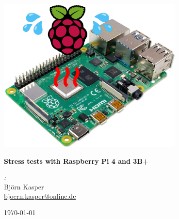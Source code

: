 \documentclass[10pt,parskip=half,
toc=sectionentrywithdots,
bibliography=totocnumbered,
captions=tableheading,numbers=noendperiod]{scrartcl}
\begin{document}
    \begin{titlepage}
  \begin{flushright}
    \includegraphics[width=0.7\textwidth]{Raspberry_Pi4_stress_test_files/Cover_image.pdf}
  \end{flushright}

  \begin{center}

  \vspace*{1cm}

  \Huge\textbf{Stress tests with Raspberry Pi 4 and 3B+}

  \vspace{0.5cm}

  \vspace{1.5cm}

  \begin{minipage}{0.8\textwidth}
    \begin{center}
    \begin{minipage}{0.39\textwidth}
    \begin{flushleft} \Large
    \emph{:}\\Björn Kasper\\\href{mailto:bjoern.kasper@online.de}{bjoern.kasper@online.de}
    \end{flushleft}
    \end{minipage}
    \hspace{\fill}
    \begin{minipage}{0.39\textwidth}
    \begin{flushright} \Large
    \end{flushright}
    \end{minipage}
    \end{center}
  \end{minipage}

  \vfill

  \begin{minipage}{0.8\textwidth}
  \begin{center}
  \end{center}
  \end{minipage}

  \vspace{0.8cm}

  \vspace{0.4cm}

  \today

  \end{center}
  \end{titlepage}
\end{document}
